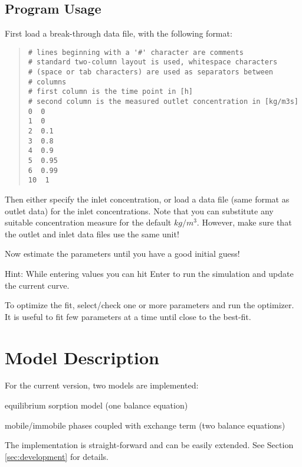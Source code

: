 \documentclass[a4paper,fleqn,11pt]{article}
\numberwithin{equation}{section}
\newenvironment{tight_enumerate}
{\begin{enumerate}
  \setlength{\itemsep}{1pt}
  \setlength{\parskip}{0pt}
  \setlength{\parsep}{0pt}}
{\end{enumerate}}
\begin{document}
\subsection{Program Usage}
First load a break-through data file, with the following format:
\begin{quote}
\footnotesize
\begin{verbatim}
# lines beginning with a '#' character are comments
# standard two-column layout is used, whitespace characters
# (space or tab characters) are used as separators between
# columns
# first column is the time point in [h]
# second column is the measured outlet concentration in [kg/m3s]
0  0
1  0
2  0.1
3  0.8
4  0.9
5  0.95
6  0.99
10  1
\end{verbatim}
\end{quote}
Then either specify the inlet concentration, or load a data file (same format as outlet data) for the inlet concentrations. Note that you can substitute any suitable concentration measure for the default $kg/m^3$. However, make sure that the outlet and inlet data files use the same unit!

Now estimate the parameters until you have a good initial guess!

Hint: While entering values you can hit Enter to run the simulation and update the current curve.

To optimize the fit, select/check one or more parameters and run the optimizer. It is useful to fit few parameters at a time until close to the best-fit.

\section{Model Description}
For the current version, two models are implemented:
\begin{tight_enumerate}
  \item equilibrium sorption model (one balance equation)
  \item mobile/immobile phases coupled with exchange term (two balance equations)
\end{tight_enumerate}
The implementation is straight-forward and can be easily extended. See Section \ref{sec:development} for details.
\end{document}
